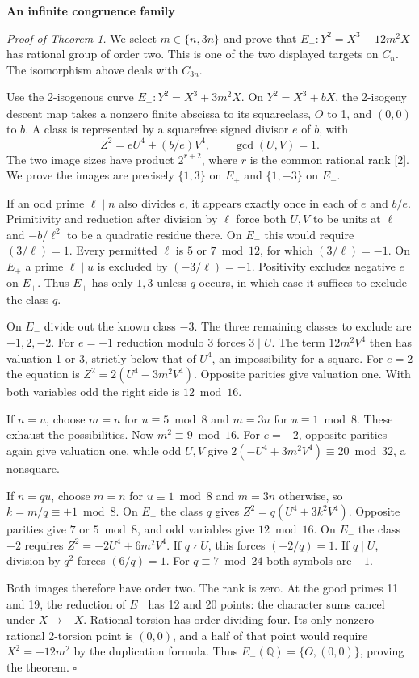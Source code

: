 \documentclass[12pt]{article}
\newcommand{\Q}{\mathbb Q}\newcommand{\Z}{\mathbb Z}
\newcommand{\heading}[1]{{\Large\bfseries\color{ink}#1}\par\vspace{3pt}}
\begin{document}
\newpage
\heading{An infinite congruence family}
\textit{Proof of Theorem 1.} We select $m\in\{n,3n\}$ and prove that
$E_-:Y^2=X^3-12m^2X$ has rational group of order two. This is one of the two displayed targets on $C_n$. The isomorphism above deals with $C_{3n}$.

Use the 2-isogenous curve $E_+:Y^2=X^3+3m^2X$. On $Y^2=X^3+bX$, the 2-isogeny descent map takes a nonzero finite abscissa to its squareclass, $O$ to 1, and $(0,0)$ to $b$. A class is represented by a squarefree signed divisor $e$ of $b$, with
\[
 Z^2=eU^4+(b/e)V^4,\qquad \gcd(U,V)=1 .
\]
The two image sizes have product $2^{r+2}$, where $r$ is the common rational rank [2]. We prove the images are precisely $\{1,3\}$ on $E_+$ and $\{1,-3\}$ on $E_-$.

If an odd prime $\ell\mid n$ also divides $e$, it appears exactly once in each of $e$ and $b/e$. Primitivity and reduction after division by $\ell$ force both $U,V$ to be units at $\ell$ and $-b/\ell^2$ to be a quadratic residue there. On $E_-$ this would require $(3/\ell)=1$. Every permitted $\ell$ is $5$ or $7\bmod12$, for which $(3/\ell)=-1$. On $E_+$ a prime $\ell\mid u$ is excluded by $(-3/\ell)=-1$. Positivity excludes negative $e$ on $E_+$. Thus $E_+$ has only $1,3$ unless $q$ occurs, in which case it suffices to exclude the class $q$.

On $E_-$ divide out the known class $-3$. The three remaining classes to exclude are $-1,2,-2$. For $e=-1$ reduction modulo 3 forces $3\mid U$. The term $12m^2V^4$ then has valuation 1 or 3, strictly below that of $U^4$, an impossibility for a square. For $e=2$ the equation is $Z^2=2(U^4-3m^2V^4)$. Opposite parities give valuation one. With both variables odd the right side is $12\bmod16$.

If $n=u$, choose $m=n$ for $u\equiv5\bmod8$ and $m=3n$ for $u\equiv1\bmod8$. These exhaust the possibilities. Now $m^2\equiv9\bmod16$. For $e=-2$, opposite parities again give valuation one, while odd $U,V$ give $2(-U^4+3m^2V^4)\equiv20\bmod32$, a nonsquare.

If $n=qu$, choose $m=n$ for $u\equiv1\bmod8$ and $m=3n$ otherwise, so $k=m/q\equiv\pm1\bmod8$. On $E_+$ the class $q$ gives $Z^2=q(U^4+3k^2V^4)$. Opposite parities give $7$ or $5\bmod8$, and odd variables give $12\bmod16$. On $E_-$ the class $-2$ requires $Z^2=-2U^4+6m^2V^4$. If $q\nmid U$, this forces $(-2/q)=1$. If $q\mid U$, division by $q^2$ forces $(6/q)=1$. For $q\equiv7\bmod24$ both symbols are $-1$.

Both images therefore have order two. The rank is zero. At the good primes 11 and 19, the reduction of $E_-$ has 12 and 20 points: the character sums cancel under $X\mapsto-X$. Rational torsion has order dividing four. Its only nonzero rational 2-torsion point is $(0,0)$, and a half of that point would require $X^2=-12m^2$ by the duplication formula. Thus $E_-(\Q)=\{O,(0,0)\}$, proving the theorem. \hfill$\square$
\end{document}
